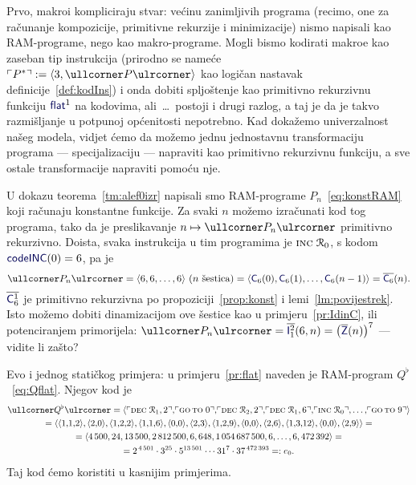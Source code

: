Prvo, makroi kompliciraju stvar: većinu zanimljivih programa (recimo, one za računanje kompozicije, primitivne rekurzije i minimizacije) nismo napisali kao RAM-programe, nego kao makro-programe. Mogli bismo kodirati makroe kao zaseban tip instrukcija (prirodno se nameće $\kins{P^*}:=\langle3,\kprog{P}\rangle$ kao logičan nastavak definicije~\ref{def:kodIns}) i onda dobiti spljoštenje kao primitivno rekurzivnu funkciju $\f{flat}^1$ na kodovima, ali~\ldots\ postoji i drugi razlog, a taj je da je takvo razmišljanje u potpunoj općenitosti nepotrebno. Kad dokažemo univerzalnost našeg modela, vidjet ćemo da možemo jednu jednostavnu transformaciju programa --- specijalizaciju --- napraviti kao primitivno rekurzivnu funkciju, a sve ostale transformacije napraviti pomoću nje.


\begin{primjer}[{name=[primitivna rekurzivnost generatora koda za konstantne funkcije]}]\label{pr:kodkonst}
U dokazu teorema~\ref{tm:alef0izr} napisali smo RAM-pro\-gra\-me $P_n$~\eqref{eq:konstRAM} koji računaju konstantne funkcije. Za svaki $n$ možemo izračunati kod tog programa, tako da je preslikavanje $n\mapsto\kprog{P_n}$ primitivno rekurzivno. Doista, svaka instrukcija u tim programima je $\textsc{inc}\;\mathcal R_{0}$, s kodom $\f{codeINC}(0)=6$, pa je
\begin{equation}
    \kprog{P_n}=\langle6,6,\dotsc,6\rangle\text{ ($n$ šestica)}=\langle \f C_6(0),\f C_6(1),\dotsc,\f C_6(n-1)\rangle=\overline{\f C_6}(n)\text.
\end{equation}
$\overline{\f C_6^1}$ je primitivno rekurzivna po propoziciji~\ref{prop:konst} i lemi~\ref{lm:povijestrek}.
    Isto možemo dobiti dinamizacijom ove šestice kao u primjeru~\ref{pr:IdinC}, ili potenciranjem primorijela: $\kprog{P_n}=\overline{\f I_1^2}(6,n)=\bigl(\overline{\f Z}(n)\bigr)^7$ --- vidite li zašto?
\end{primjer}

\begin{primjer}[{name=[kod spljoštenja programa $Q$]}]\label{pr:Qflatkod}
Evo i jednog statičkog primjera: u primjeru~\ref{pr:flat} naveden je RAM-program $Q^\flat$~\eqref{eq:Qflat}. Njegov kod je
\begin{multline}
    \kprog{Q^\flat}=\langle\kins{\decr12},\!\kins{\goto\;0},\!\kins{\decr22},\!\kins{\decr16},\!\kins{\incr0},\dotsc,\!\kins{\goto\;9}\rangle\\
    =\langle\langle1,\!1,\!2\rangle,\langle2,\!0\rangle,\langle1,\!2,\!2\rangle,\langle1,\!1,\!6\rangle,\langle0,\!0\rangle,\langle2,\!3\rangle,\langle1,\!2,\!9\rangle,\langle0,\!0\rangle,\langle2,\!6\rangle,\langle1,\!3,\!12\rangle,\langle0,\!0\rangle,\langle2,\!9\rangle\rangle=\\
    =\langle4\,500,24,13\,500,2\,812\,500,6,648,1\,054\,687\,500,6,\dotsc,6,472\,392\rangle=\\
    =2^{\,4\,501}\cdot3^{25}\cdot5^{13\,501}\mathbin{\dotsm}31^7\cdot37^{\,472\,393}=:e_0\text.
\end{multline}
Taj kod ćemo koristiti u kasnijim primjerima.
\end{primjer}

